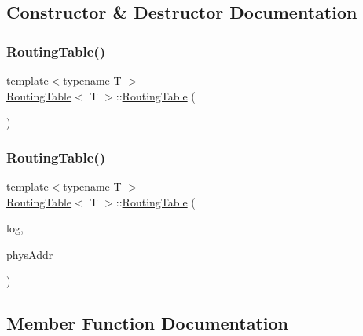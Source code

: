 \subsection{Constructor \& Destructor Documentation}
\mbox{\label{classRoutingTable_a3a9220d6612a6731f4dcb2bf45265c2e}} 
\subsubsection{\texorpdfstring{Routing\+Table()}{RoutingTable()}\hspace{0.1cm}{\footnotesize\ttfamily [1/2]}}
{\footnotesize\ttfamily template$<$typename T $>$ \\
\hyperlink{classRoutingTable}{Routing\+Table}$<$ T $>$\+::\hyperlink{classRoutingTable}{Routing\+Table} (\begin{DoxyParamCaption}{ }\end{DoxyParamCaption})\hspace{0.3cm}{\ttfamily [inline]}}

\mbox{\label{classRoutingTable_ac7478945fabd9d107e8ecdafdb094602}} 
\subsubsection{\texorpdfstring{Routing\+Table()}{RoutingTable()}\hspace{0.1cm}{\footnotesize\ttfamily [2/2]}}
{\footnotesize\ttfamily template$<$typename T $>$ \\
\hyperlink{classRoutingTable}{Routing\+Table}$<$ T $>$\+::\hyperlink{classRoutingTable}{Routing\+Table} (\begin{DoxyParamCaption}\item[{\hyperlink{structLogicalAddress}{Logical\+Address}}]{log,  }\item[{T}]{phys\+Addr }\end{DoxyParamCaption})\hspace{0.3cm}{\ttfamily [inline]}}



\subsection{Member Function Documentation}
\mbox{\label{classRoutingTable_a82506122881b23b6c508ee3c5eceea2d}} 

